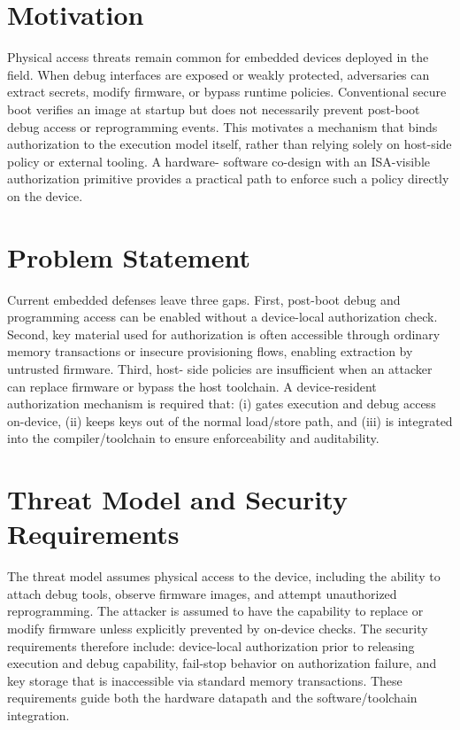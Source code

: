 \section{Motivation}
Physical access threats remain common for embedded devices deployed in the field. When
debug interfaces are exposed or weakly protected, adversaries can extract secrets,
modify firmware, or bypass runtime policies. Conventional secure boot verifies an image
at startup but does not necessarily prevent post-boot debug access or reprogramming
events. This motivates a mechanism that binds authorization to the execution model
itself, rather than relying solely on host-side policy or external tooling. A hardware-
software co-design with an ISA-visible authorization primitive provides a practical
path to enforce such a policy directly on the device.

\section{Problem Statement}
Current embedded defenses leave three gaps. First, post-boot debug and programming
access can be enabled without a device-local authorization check. Second, key material
used for authorization is often accessible through ordinary memory transactions or
insecure provisioning flows, enabling extraction by untrusted firmware. Third, host-
side policies are insufficient when an attacker can replace firmware or bypass the
host toolchain. A device-resident authorization mechanism is required that: (i) gates
execution and debug access on-device, (ii) keeps keys out of the normal load/store
path, and (iii) is integrated into the compiler/toolchain to ensure enforceability and
auditability.

\section{Threat Model and Security Requirements}
The threat model assumes physical access to the device, including the ability to attach
debug tools, observe firmware images, and attempt unauthorized reprogramming. The
attacker is assumed to have the capability to replace or modify firmware unless
explicitly prevented by on-device checks. The security requirements therefore include:
device-local authorization prior to releasing execution and debug capability, fail-stop
behavior on authorization failure, and key storage that is inaccessible via standard
memory transactions. These requirements guide both the hardware datapath and the
software/toolchain integration.

